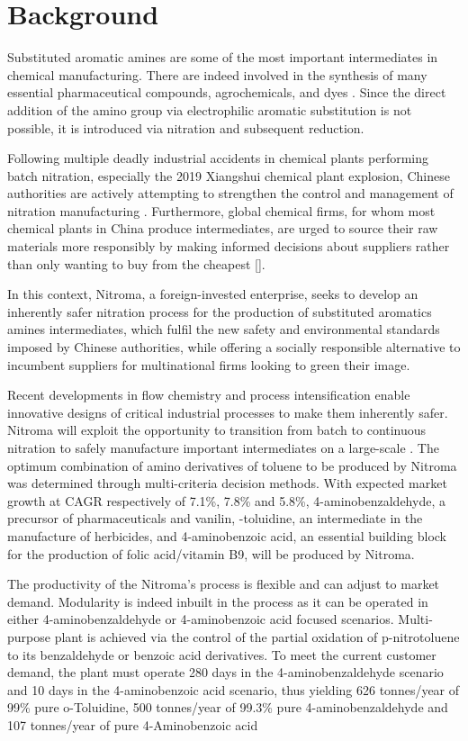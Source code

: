 \section{Background}

Substituted aromatic amines are some of the most important intermediates in chemical manufacturing. There are indeed involved in the synthesis of many essential pharmaceutical compounds, agrochemicals, and dyes \cite{vogt_amines_2000}. Since the direct addition of the amino group via electrophilic aromatic substitution is not possible, it is introduced via nitration and subsequent reduction. 

Following multiple deadly industrial accidents in chemical plants performing batch nitration, especially the 2019 Xiangshui chemical plant explosion, Chinese authorities are actively attempting to strengthen the control and management of nitration manufacturing \cite{el_diario_china_2019}. Furthermore, global chemical firms, for whom most chemical plants in China produce intermediates, are urged to source their raw materials more responsibly by making informed decisions about suppliers rather than only wanting to buy from the cheapest [].

In this context, Nitroma, a foreign-invested enterprise, seeks to develop an inherently safer nitration process for the production of substituted aromatics amines intermediates, which fulfil the new safety and environmental standards imposed by Chinese authorities, while offering a socially responsible alternative to incumbent suppliers for multinational firms looking to green their image. 

Recent developments in flow chemistry and process intensification enable innovative designs of critical industrial processes to make them inherently safer. Nitroma will exploit the opportunity to transition  from batch to continuous nitration to safely manufacture important intermediates on a large-scale \cite{di_miceli_raimondi_safety_2015}. The optimum combination of amino derivatives of toluene to be produced by Nitroma was determined through multi-criteria decision methods.
With expected market growth at CAGR respectively of 7.1\%, 7.8\% and 5.8\%, 4-aminobenzaldehyde, a precursor of pharmaceuticals and vanilin, \ortho-toluidine, an intermediate in the manufacture of herbicides, and 4-aminobenzoic acid, an essential building block for the production of folic acid/vitamin B9, will be produced by Nitroma. 

The productivity of the Nitroma's process is flexible and can adjust to market demand. Modularity is indeed inbuilt in the process as it can be operated in either 4-aminobenzaldehyde or 4-aminobenzoic acid focused scenarios. Multi-purpose plant is achieved via the control of the partial oxidation of p-nitrotoluene to its benzaldehyde or benzoic acid derivatives. To meet the current customer demand, the plant must operate 280 days in the 4-aminobenzaldehyde scenario and 10 days in the 4-aminobenzoic acid scenario, thus yielding 626 tonnes/year of 99\% pure o-Toluidine, 500 tonnes/year of 99.3\% pure 4-aminobenzaldehyde and 107 tonnes/year of pure 4-Aminobenzoic acid





